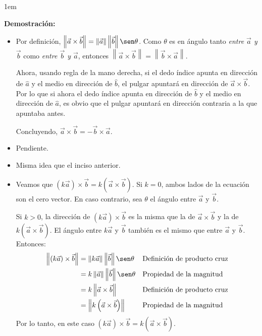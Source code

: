\documentclass[12pt, fleqn]{report}                             %
\newenvironment{SmallIndentation}[1][0.75em]                    %
        {\begin{adjustwidth}{#1}{}\begin{footnotesize}}             %
        {\end{footnotesize}\end{adjustwidth}}                       %
\theoremstyle{break}                                            %
\newcommand{\Wrap}[1]{\left( #1 \right)}                        %
\newcommand{\Abs}[1]{\left\lVert #1 \right\lVert}               %
\begin{document}
            \begin{SmallIndentation}[1em]
                \textbf{Demostración:}
                \begin{itemize}\setlength\itemsep{0em}
                    \item Por definición, $\Abs{\vec{a} \times \vec{b}} = \Abs{\vec{a}} \Abs{\vec{b}} \sen \theta$. Como $\theta$ es en ángulo tanto \emph{entre $\vec{a}$ y $\vec{b}$} como \emph{entre $\vec{b}$ y $\vec{a}$}, entonces $\Abs{\vec{a} \times \vec{b}} = \Abs{\vec{b} \times \vec{a}}$.
                    
                    Ahora, usando regla de la mano derecha, si el dedo índice apunta en dirección de $\hat{a}$ y el medio en dirección de $\hat{b}$, el pulgar apuntará en dirección de $\vec{a} \times \vec{b}$. Por lo que si ahora el dedo índice apunta en dirección de $\hat{b}$ y el medio en dirección de $\hat{a}$, es obvio que el pulgar apuntará en dirección contraria a la que apuntaba antes.
                    
                    Concluyendo, $\vec{a} \times \vec{b} = -\vec{b} \times \vec{a}$.
                    
                    \item Pendiente.
                    
                    \item Misma idea que el inciso anterior.
                    
                    \item Veamos que $\Wrap{k \vec{a}} \times \vec{b} = k\Wrap{\vec{a} \times \vec{b}}$. Si $k=0$, ambos lados de la ecuación son el cero vector. En caso contrario, sea $\theta$ el ángulo entre $\vec{a}$ y $\vec{b}$.
                    
                    Si $k>0$, la dirección de $\Wrap{k \vec{a}} \times \vec{b}$ es la misma que la de $\vec{a} \times \vec{b}$ y la de $k\Wrap{\vec{a} \times \vec{b}}$. El ángulo entre $k\vec{a}$ y $\vec{b}$ también es el mismo que entre $\vec{a}$ y $\vec{b}$. Entonces:
                    \begin{align*}
                        \Abs{(k\vec{a}) \times \vec{b}} &= \Abs{k\vec{a}} \Abs{\vec{b}} \sen \theta &&\mbox{Definición de producto cruz}\\
                        &= k \Abs{\vec{a}} \Abs{\vec{b}} \sen \theta &&\mbox{Propiedad de la magnitud}\\
                        &= k \Abs{\vec{a} \times \vec{b}} &&\mbox{Definición de producto cruz}\\
                        &= \Abs{k\Wrap{\vec{a} \times \vec{b}}} && \mbox{Propiedad de la magnitud}
                    \end{align*}
                    Por lo tanto, en este caso $\Wrap{k\vec{a}} \times \vec{b} = k\Wrap{\vec{a} \times \vec{b}}$.
                    

\end{itemize}
\end{SmallIndentation}
\end{document}

